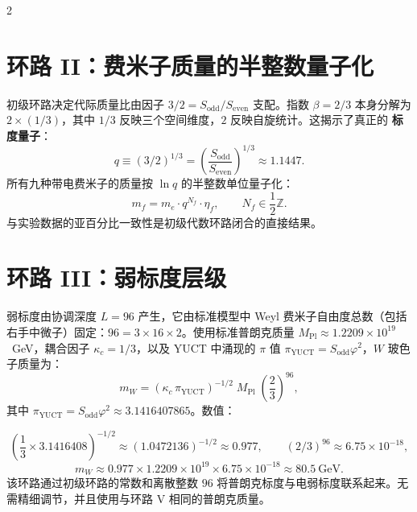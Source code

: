 \documentclass[12pt,a4paper]{article}
\begin{document}
\begin{multicols}{2}
		\section{环路 II：费米子质量的半整数量子化}
		
		初级环路决定代际质量比由因子 \(3/2 = S_{\mathrm{odd}}/S_{\mathrm{even}}\) 支配。指数 \(\beta = 2/3\) 本身分解为 \(2 \times (1/3)\)，其中 \(1/3\) 反映三个空间维度，\(2\) 反映自旋统计。这揭示了真正的 \textbf{标度量子}：
		\begin{equation}
			q \equiv (3/2)^{1/3} = \left( \frac{S_{\mathrm{odd}}}{S_{\mathrm{even}}} \right)^{1/3} \approx 1.1447.
		\end{equation}
		所有九种带电费米子的质量按 \(\ln q\) 的半整数单位量子化：
		\begin{equation}
			m_f = m_e \cdot q^{N_f} \cdot \eta_f, \qquad N_f \in \frac{1}{2}\mathbb{Z}.
		\end{equation}
		与实验数据的亚百分比一致性是初级代数环路闭合的直接结果。
		
		\section{环路 III：弱标度层级}
		
		弱标度由协调深度 \(L = 96\) 产生，它由标准模型中 Weyl 费米子自由度总数（包括右手中微子）固定：\(96 = 3 \times 16 \times 2\)。使用标准普朗克质量 \(M_{\mathrm{Pl}} \approx 1.2209 \times 10^{19}\)~GeV，耦合因子 \(\kappa_c = 1/3\)，以及 YUCT 中涌现的 \(\pi\) 值 \(\pi_{\mathrm{YUCT}} = S_{\mathrm{odd}}\varphi^2\)，\(W\) 玻色子质量为：
		\begin{equation}
			\boxed{m_W = \left( \kappa_c \, \pi_{\mathrm{YUCT}} \right)^{-1/2} \; M_{\mathrm{Pl}} \; \left( \frac{2}{3} \right)^{96}},
		\end{equation}
		其中 \(\pi_{\mathrm{YUCT}} = S_{\mathrm{odd}}\varphi^2 \approx 3.1416407865\)。数值：
	\end{multicols}
	\small
	\[
	\left( \frac{1}{3} \times 3.1416408 \right)^{-1/2} \approx (1.0472136)^{-1/2} \approx 0.977,\qquad 
	(2/3)^{96} \approx 6.75 \times 10^{-18},
	\]
	\[
	m_W \approx 0.977 \times 1.2209 \times 10^{19} \times 6.75 \times 10^{-18} \approx 80.5\ \text{GeV}.
	\]
	该环路通过初级环路的常数和离散整数 \(96\) 将普朗克标度与电弱标度联系起来。无需精细调节，并且使用与环路 V 相同的普朗克质量。
\end{document}
